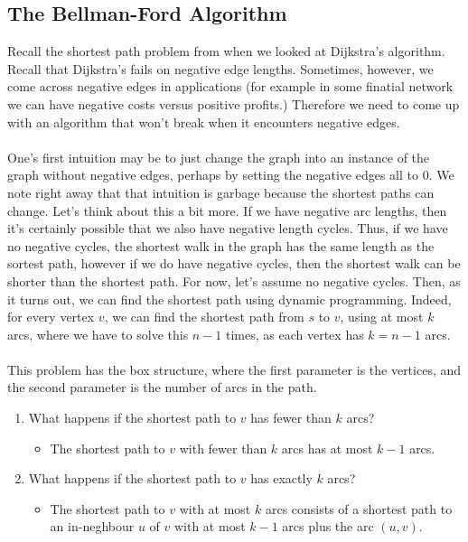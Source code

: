 \documentclass{article}
\begin{document}
\subsection{The Bellman-Ford Algorithm}
Recall the shortest path problem from when we looked at Dijkstra's algorithm. Recall that Dijkstra's fails on negative edge lengths. Sometimes, however, we come across negative edges in applications (for example in some finatial network we can have negative costs versus positive profits.) Therefore we need to come up with an algorithm that won't break when it encounters negative edges.\\\\
One's first intuition may be to just change the graph into an instance of the graph without negative edges, perhaps by setting the negative edges all to 0. We note right away that that intuition is garbage because the shortest paths can change. Let's think about this a bit more. If we have negative arc lengths, then it's certainly possible that we also have negative length cycles. Thus, if we have no negative cycles, the shortest walk in the graph has the same length as the sortest path, however if we do have negative cycles, then the shortest walk can be shorter than the shortest path. For now, let's assume no negative cycles. Then, as it turns out, we can find the shortest path using dynamic programming. Indeed, for every vertex $v$, we can find the shortest path from $s$ to $v$, using at most $k$ arcs, where we have to solve this $n-1$ times, as each vertex has $k = n-1$ arcs.\\\\
This problem has the box structure, where the first parameter is the vertices, and the second parameter is the number of arcs in the path.
\begin{enumerate}
	\item What happens if the shortest path to $v$ has fewer than $k$ arcs?
	\begin{itemize}
		\item The shortest path to $v$ with fewer than $k$ arcs has at most $k-1$ arcs.
	\end{itemize}
	\item What happens if the shortest path to $v$ has exactly $k$ arcs?
	\begin{itemize}
		\item The shortest path to $v$ with at most $k$ arcs consists of a shortest path to an in-neghbour $u$ of $v$ with at most $k-1$ arcs plus the arc $(u, v)$.
	\end{itemize}
\end{enumerate}
\end{document}
